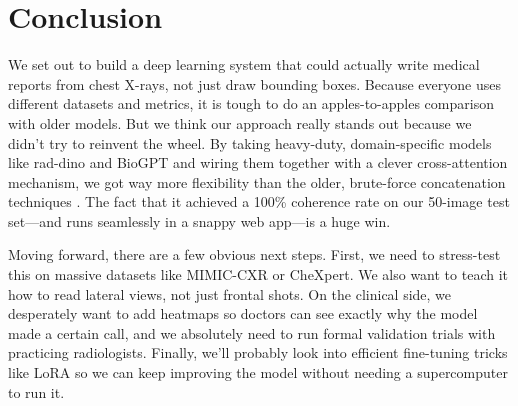 \documentclass[conference]{IEEEtran}
\begin{document}
\section{Conclusion}

We set out to build a deep learning system that could actually write medical reports from chest X-rays, not just draw bounding boxes. Because everyone uses different datasets and metrics, it is tough to do an apples-to-apples comparison with older models. But we think our approach really stands out because we didn't try to reinvent the wheel. By taking heavy-duty, domain-specific models like rad-dino and BioGPT and wiring them together with a clever cross-attention mechanism, we got way more flexibility than the older, brute-force concatenation techniques \cite{jing2018automatic}. The fact that it achieved a 100\% coherence rate on our 50-image test set—and runs seamlessly in a snappy web app—is a huge win.

Moving forward, there are a few obvious next steps. First, we need to stress-test this on massive datasets like MIMIC-CXR or CheXpert. We also want to teach it how to read lateral views, not just frontal shots. On the clinical side, we desperately want to add heatmaps so doctors can see exactly why the model made a certain call, and we absolutely need to run formal validation trials with practicing radiologists. Finally, we'll probably look into efficient fine-tuning tricks like LoRA so we can keep improving the model without needing a supercomputer to run it.
\end{document}
